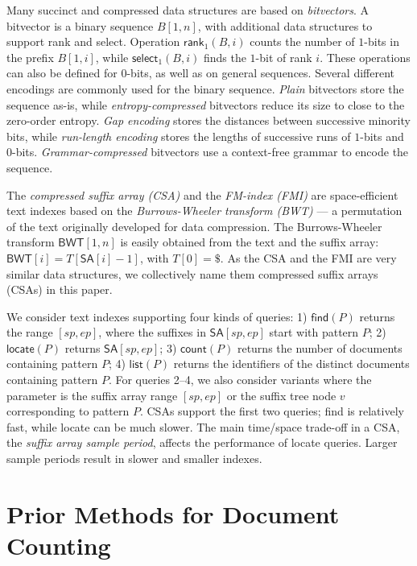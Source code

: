 \documentclass[11pt]{llncs}
\newcommand{\SA}{\ensuremath{\mathsf{SA}}}
\newcommand{\BWT}{\ensuremath{\mathsf{BWT}}}
\newcommand{\find}{\textsf{find}}
\newcommand{\locate}{\textsf{locate}}
\newcommand{\rank}{\textsf{rank}}
\newcommand{\select}{\textsf{select}}
\newcommand{\mfind}{\ensuremath{\mathsf{find}}}
\newcommand{\mlocate}{\ensuremath{\mathsf{locate}}}
\newcommand{\mcount}{\ensuremath{\mathsf{count}}}
\newcommand{\mlist}{\ensuremath{\mathsf{list}}}
\newcommand{\mrank}{\ensuremath{\mathsf{rank}}}
\newcommand{\mselect}{\ensuremath{\mathsf{select}}}
\newcommand{\onebit}{$1$\nobreakdash-bit}
\newcommand{\zerobit}{$0$\nobreakdash-bit}
\begin{document}
Many succinct and compressed data structures are based on \emph{bitvectors}. A bitvector is a binary sequence $B[1,n]$, with additional data structures to support \rank{} and \select. Operation $\mrank_{1}(B,i)$ counts the number of \onebit{}s in the prefix $B[1,i]$, while $\mselect_{1}(B,i)$ finds the \onebit{} of rank $i$. These operations can also be defined for \zerobit{}s, as well as on general sequences. Several different encodings are commonly used for the binary sequence. \emph{Plain} bitvectors store the sequence as-is, while \emph{entropy-compressed} bitvectors reduce its size to close to the zero-order entropy. \emph{Gap encoding} stores the distances between successive minority bits, while \emph{run-length encoding} stores the lengths of successive runs of \onebit{}s and \zerobit{}s. \emph{Grammar-compressed} bitvectors use a context-free grammar to encode the sequence.

The \emph{compressed suffix array (CSA)} \cite{GV05} and the \emph{FM-index (FMI)} \cite{FM05} are space-efficient text indexes based on the \emph{Burrows-Wheeler transform (BWT)} \cite{BW94} --- a permutation of the text originally developed for data compression. The Burrows-Wheeler transform $\BWT[1,n]$ is easily obtained from the text and the suffix array: $\BWT[i] = T[\SA[i]-1]$, with $T[0]=\$$. As the CSA and the FMI are very similar data structures, we collectively name them compressed suffix arrays (CSAs) in this paper.

We consider text indexes supporting four kinds of queries: 1) $\mfind(P)$ returns the range $[sp,ep]$, where the suffixes in $\SA[sp,ep]$ start with pattern $P$; 2) $\mlocate(P)$ returns $\SA[sp,ep]$; 3) $\mcount(P)$ returns the number of documents containing pattern $P$; 4) $\mlist(P)$ returns the identifiers of the distinct documents containing pattern $P$. For queries 2--4, we also consider variants where the parameter is the suffix array range $[sp,ep]$ or the suffix tree node $v$ corresponding to pattern $P$. CSAs support the first two queries; \find{} is relatively fast, while \locate{} can be much slower. The main time/space trade-off in a CSA, the \emph{suffix array sample period}, affects the performance of \locate{} queries. Larger sample periods result in slower and smaller indexes. 


\section{Prior Methods for Document Counting}\label{section:algorithms}
\end{document}
